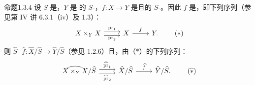 \begin{SGAresult}{命题}{1.3.4}
设 $S$ 是，$Y$ 是 的 $S$-，$f:X\to Y$ 是且的 $S$-。因此 $f$ 是，即下列序列（参见第 IV 讲 6.3.1（iv）及 1.3）：
\[
\begin{tikzcd}
 X\times_Y X\arrow[r,shift left=.6ex,"\operatorname{pr}_1"]\arrow[r,shift right=.6ex,"\operatorname{pr}_2"']&X\arrow[r,"f"]&Y.
\end{tikzcd}\tag{$*$}
\]
则 $\widehat S$- $\widehat f:\widehat X/\widehat S\to\widehat Y/\widehat S$（参见 1.2.6）且，由（$*$）的下列序列：
\[
\begin{tikzcd}
 \widehat{X\times_Y X}/\widehat S\arrow[r,shift left=.6ex,"\widehat{\operatorname{pr}}_1"]\arrow[r,shift right=.6ex,"\widehat{\operatorname{pr}}_2"']&\widehat X/\widehat S\arrow[r,"\widehat f"]&\widehat Y/\widehat S.
\end{tikzcd}\tag{$\widehat *$}
\]
\end{SGAresult}
